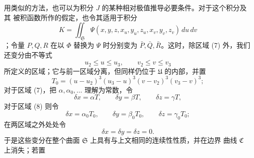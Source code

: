 \documentclass[11pt,a4paper,leqno]{article}
\begin{document}
用类似的方法，也可以为积分 $J$ 的某种相对极值推导必要条件。对于这个积分及其
被积函数所作的假定，也令其适用于积分
\[
K=\iint_{\mathfrak{S}}
\Psi(x,y,z,x_u,y_u,z_u,x_v,y_v,z_v)\,du\,dv
\]
；令量 $P,Q,R$ 在以 $\Phi$ 替换为 $\Psi$ 时分别变为
$\bar P,\bar Q,\bar R$。这时，除区域 (7) 外，我们还变分由不等式
\begin{equation}\tag{8}
u_2\leq u\leq u_3,\qquad v_2\leq v\leq v_3
\end{equation}
所定义的区域；它与前一区域分离，但同样仍位于 $\mathfrak{U}$ 的内部，并置
\[
T_0=(u-u_2)^3(u_3-u)^3(v-v_2)^3(v_3-v)^3;
\]
对于区域 (7)，把 $\alpha,\alpha_0,\ldots$ 理解为常数，令
\[
\delta x=\alpha T,\qquad \delta y=\beta T,\qquad \delta z=\gamma T,
\]
对于区域 (8) 则令
\[
\delta x=\alpha_0T_0,\qquad \delta y=\beta_0T_0,
\qquad \delta z=\gamma_0T_0;
\]
在两区域之外处处令
\[
\delta x=\delta y=\delta z=0.
\]
于是这些变分在整个曲面 $\mathfrak{S}$ 上具有与上文相同的连续性性质，并在边界
曲线 $\mathfrak{C}$ 上消失；若置
\end{document}
